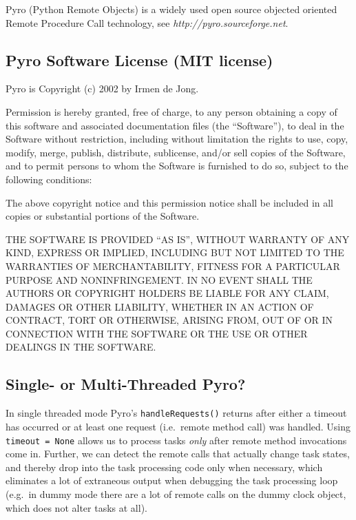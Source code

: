 \documentclass[11pt,a4paper]{article}
\begin{document}
Pyro (Python Remote Objects) is a widely used open source objected
oriented Remote Procedure Call technology, see {\em
http://pyro.sourceforge.net}.

\subsection{Pyro Software License (MIT license)}
\label{PyroSoftwareLicense(MITlicense)}

Pyro is Copyright (c) 2002  by Irmen de Jong.

Permission is hereby granted, free of charge, to any person obtaining a
copy of this software and associated documentation files (the
``Software''), to deal in the Software without restriction, including
without limitation the rights to use, copy, modify, merge, publish,
distribute, sublicense, and/or sell copies of the Software, and to
permit persons to whom the Software is furnished to do so, subject to
the following conditions:

The above copyright notice and this permission notice shall be included
in all copies or substantial portions of the Software.

THE SOFTWARE IS PROVIDED ``AS IS'', WITHOUT WARRANTY OF ANY KIND,
EXPRESS OR IMPLIED, INCLUDING BUT NOT LIMITED TO THE WARRANTIES OF
MERCHANTABILITY, FITNESS FOR A PARTICULAR PURPOSE AND NONINFRINGEMENT.
IN NO EVENT SHALL THE AUTHORS OR COPYRIGHT HOLDERS BE LIABLE FOR ANY
CLAIM, DAMAGES OR OTHER LIABILITY, WHETHER IN AN ACTION OF CONTRACT,
TORT OR OTHERWISE, ARISING FROM, OUT OF OR IN CONNECTION WITH THE
SOFTWARE OR THE USE OR OTHER DEALINGS IN THE SOFTWARE.
                                          
\subsection{Single- or Multi-Threaded Pyro?}
\label{Single-orMulti-ThreadedPyro?}

In single threaded mode Pyro's \lstinline=handleRequests()= returns
after either a timeout has occurred or at least one request
(i.e.\ remote method call) was handled. Using \lstinline|timeout = None| 
allows us to process tasks {\em only} after remote method invocations
come in.  Further, we can detect the remote calls that actually change
task states, and thereby drop into the task processing code only when
necessary, which eliminates a lot of extraneous output when debugging
the task processing loop (e.g.\ in dummy mode there are a lot of remote
calls on the dummy clock object, which does not alter tasks at all). 
\end{document}

